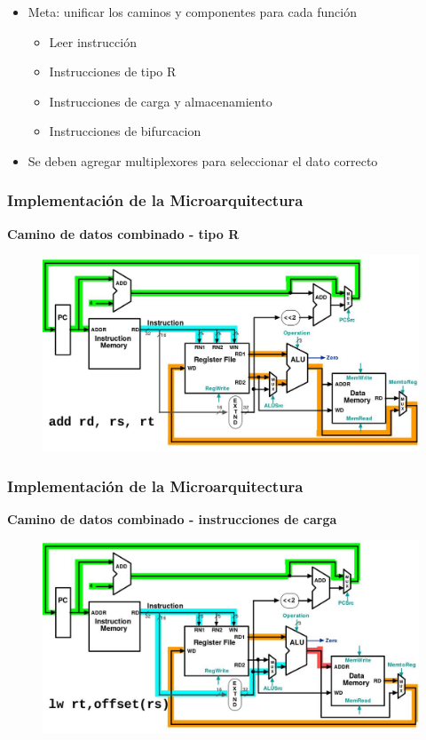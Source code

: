 \documentclass[aspectratio=169,compress]{beamer}
\begin{document}
\begin{footnotesize}
\begin{frame}
\begin{itemize}
\item Meta: unificar los caminos y componentes para cada función
\begin{itemize}
\item Leer instrucción
\item Instrucciones de tipo R
\item Instrucciones de carga y almacenamiento
\item Instrucciones de bifurcacion
\end{itemize}
\item Se deben agregar multiplexores para seleccionar el dato correcto
\end{itemize}

\end{frame}



\begin{frame}
\frametitle{Implementación de la Microarquitectura}
\begin{center}\textbf{Camino de datos combinado - tipo R}\end{center}
\begin{figure}
\includegraphics[scale=0.3]{images/add.jpg} 
\end{figure}

\end{frame}


\begin{frame}
\frametitle{Implementación de la Microarquitectura}
\begin{center}\textbf{Camino de datos combinado - instrucciones de carga}\end{center}
\begin{figure}
\includegraphics[scale=0.3]{images/lw.jpg} 
\end{figure}


\end{frame}
\end{footnotesize}
\end{document}
